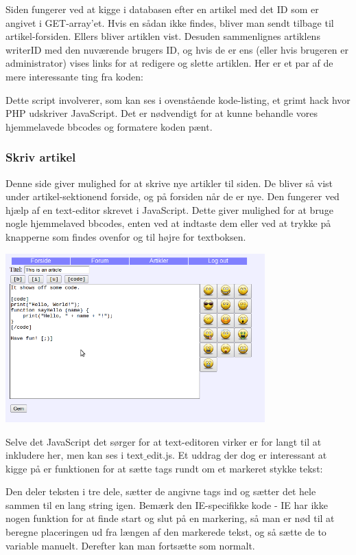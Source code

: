 \documentclass{article}
\begin{document}
Siden fungerer ved at kigge i databasen efter en artikel med det ID som er angivet i GET-array'et. Hvis en sådan ikke findes, bliver man sendt tilbage til artikel-forsiden. Ellers bliver artiklen vist. Desuden sammenlignes artiklens writerID med den nuværende brugers ID, og hvis de er ens (eller hvis brugeren er administrator) vises links for at redigere og slette artiklen. Her er et par af de mere interessante ting fra koden:



Dette script involverer, som kan ses i ovenstående kode-listing, et grimt hack hvor PHP udskriver JavaScript. Det er nødvendigt for at kunne behandle vores hjemmelavede bbcodes og formatere koden pænt.

\subsubsection{Skriv artikel}
Denne side giver mulighed for at skrive nye artikler til siden. De bliver så vist under artikel-sektionend forside, og på forsiden når de er nye. Den fungerer ved hjælp af en text-editor skrevet i JavaScript. Dette giver mulighed for at bruge nogle hjemmelaved bbcodes, enten ved at indtaste dem eller ved at trykke på knapperne som findes ovenfor og til højre for textboksen.

\includegraphics[width=100mm]{mi04.png}

Selve det JavaScript det sørger for at text-editoren virker er for langt til at inkludere her, men kan ses i text$\_$edit.js. Et uddrag der dog er interessant at kigge på er funktionen for at sætte tags rundt om et markeret stykke tekst:



Den deler teksten i tre dele, sætter de angivne tags ind og sætter det hele sammen til en lang string igen. Bemærk den IE-specifikke kode - IE har ikke nogen funktion for at finde start og slut på en markering, så man er nød til at beregne placeringen ud fra længen af den markerede tekst, og så sætte de to variable manuelt. Derefter kan man fortsætte som normalt.
\end{document}
